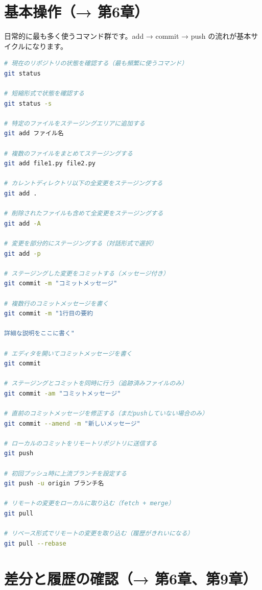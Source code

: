 \section{基本操作（→ 第6章）}

日常的に最も多く使うコマンド群です。add → commit → push の流れが基本サイクルになります。

\begin{lstlisting}[language=bash]
# 現在のリポジトリの状態を確認する（最も頻繁に使うコマンド）
git status

# 短縮形式で状態を確認する
git status -s

# 特定のファイルをステージングエリアに追加する
git add ファイル名

# 複数のファイルをまとめてステージングする
git add file1.py file2.py

# カレントディレクトリ以下の全変更をステージングする
git add .

# 削除されたファイルも含めて全変更をステージングする
git add -A

# 変更を部分的にステージングする（対話形式で選択）
git add -p

# ステージングした変更をコミットする（メッセージ付き）
git commit -m "コミットメッセージ"

# 複数行のコミットメッセージを書く
git commit -m "1行目の要約

詳細な説明をここに書く"

# エディタを開いてコミットメッセージを書く
git commit

# ステージングとコミットを同時に行う（追跡済みファイルのみ）
git commit -am "コミットメッセージ"

# 直前のコミットメッセージを修正する（まだpushしていない場合のみ）
git commit --amend -m "新しいメッセージ"

# ローカルのコミットをリモートリポジトリに送信する
git push

# 初回プッシュ時に上流ブランチを設定する
git push -u origin ブランチ名

# リモートの変更をローカルに取り込む（fetch + merge）
git pull

# リベース形式でリモートの変更を取り込む（履歴がきれいになる）
git pull --rebase
\end{lstlisting}

\section{差分と履歴の確認（→ 第6章、第9章）}

